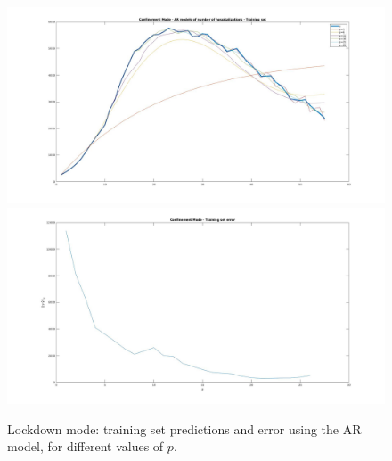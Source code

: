 \documentclass[11pt]{article}
\begin{document}
\begin{figure}[h!]
\includegraphics[scale=0.25]{Conf_train.jpg}
\includegraphics[scale=0.25]{Conf_Err_Train.jpg}
\caption{Lockdown mode: training set predictions and error using the AR model, for different values of \(p\).}
\label{fig:Conf_train}
\end{figure}
\end{document}

